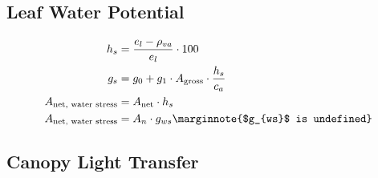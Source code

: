 \documentclass[24pt]{report}
\begin{document}
\subsection*{Leaf Water Potential}
\begin{align}
h_{s} &= \frac{e_{l} - \rho_{va}}{e_{l}} \cdot 100 \label{eqn:hs} \\
g_{s} &= g_{0} + g_{1} \cdot A_{\text{gross}} \cdot \frac{h_{s}}{c_{a}} \label{eqn:gs} \\
A_\text{net, water stress} &= A_\text{net}\cdot h_s\\
A_\text{net, water stress} &= A_n\cdot g_{ws}  \marginnote{$g_{ws}$ is undefined}
\end{align}

\subsection*{Canopy Light Transfer}
\end{document}
